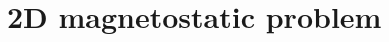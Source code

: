 \documentclass[acmtog]{acmart}
\newcommand{\nfrac}[2]{#1/#2}
\begin{document}

\section{2D magnetostatic problem}
\end{document}
